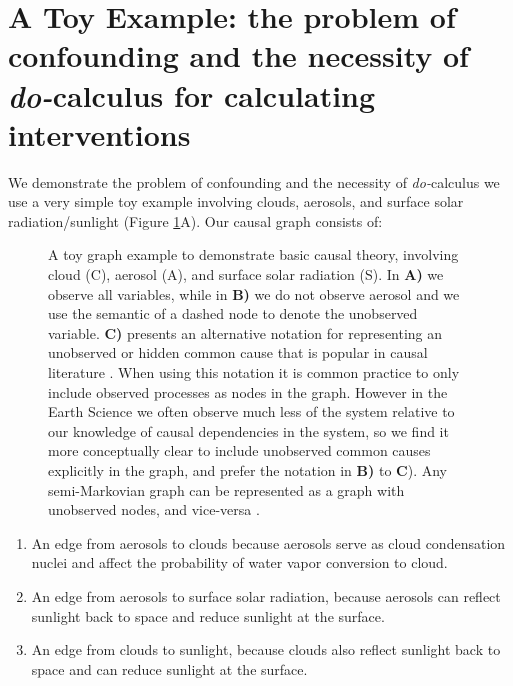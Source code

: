 \documentclass[12pt]{article}
\begin{document}
\section{A Toy Example: the problem of confounding and the necessity
  of \textit{do-}calculus for calculating interventions}
\label{sec:causal-graphs-pearls}

We demonstrate the problem of confounding and the necessity of
\textit{do-}calculus we use a very simple toy example involving
clouds, aerosols, and surface solar radiation/sunlight (Figure
\ref{fig:toy}A). Our causal graph consists of:

\begin{figure}
  \scalebox{1.0}{}
  \caption{A toy graph example to demonstrate basic causal theory,
    involving cloud (C), aerosol (A), and surface solar radiation
    (S). In \textbf{A)} we observe all variables, while in \textbf{B)}
    we do not observe aerosol and we use the semantic of a dashed node
    to denote the unobserved variable. \textbf{C)} presents an
    alternative notation for representing an unobserved or hidden
    common cause that is popular in causal literature \citep[e.g.,
    ``semi-Markovian graphs'',][]{shpitser2006}. When using this
    notation it is common practice to only include observed processes
    as nodes in the graph. However in the Earth Science we often
    observe much less of the system relative to our knowledge of
    causal dependencies in the system, so we find it more conceptually
    clear to include unobserved common causes explicitly in the graph,
    and prefer the notation in \textbf{B)} to \textbf{C}). Any
    semi-Markovian graph can be represented as a graph with unobserved
    nodes, and vice-versa \citep[e.g.,][]{lee2019structural}.}
  \label{fig:toy}
\end{figure}

\begin{enumerate}
\item An edge from aerosols to clouds because aerosols serve as cloud
  condensation nuclei and affect the probability of water vapor
  conversion to cloud.
\item An edge from aerosols to surface solar radiation, because
  aerosols can reflect sunlight back to space and reduce sunlight at
  the surface.
\item An edge from clouds to sunlight, because clouds also reflect
  sunlight back to space and can reduce sunlight at the surface.
\end{enumerate}
\end{document}
